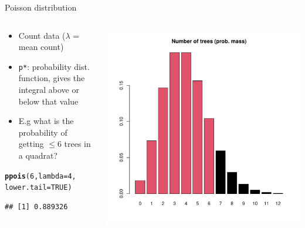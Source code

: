 \documentclass[aspectratio=169]{beamer}\usepackage[]{graphicx}\usepackage[]{color}
\makeatletter
\def\maxwidth{ %
  \ifdim\Gin@nat@width>\linewidth
    \linewidth
  \else
    \Gin@nat@width
  \fi
}
\newcommand{\hlnum}[1]{\textcolor[rgb]{0.686,0.059,0.569}{#1}}%
\newcommand{\hlstd}[1]{\textcolor[rgb]{0.345,0.345,0.345}{#1}}%
\newcommand{\hlkwc}[1]{\textcolor[rgb]{0.333,0.667,0.333}{#1}}%
\newcommand{\hlkwd}[1]{\textcolor[rgb]{0.737,0.353,0.396}{\textbf{#1}}}%
\newenvironment{kframe}{%
 \def\at@end@of@kframe{}%
 \ifinner\ifhmode%
  \def\at@end@of@kframe{\end{minipage}}%
  \begin{minipage}{\columnwidth}%
 \fi\fi%
 \def\FrameCommand##1{\hskip\@totalleftmargin \hskip-\fboxsep
 \colorbox{shadecolor}{##1}\hskip-\fboxsep
     \hskip-\linewidth \hskip-\@totalleftmargin \hskip\columnwidth}%
 \MakeFramed {\advance\hsize-\width
   \@totalleftmargin\z@ \linewidth\hsize
   \@setminipage}}%
 {\par\unskip\endMakeFramed%
 \at@end@of@kframe}
\newenvironment{knitrout}{}{} %
\makeatother
\begin{document}
\begin{frame}[fragile]{Poisson distribution}
\begin{columns}
  \begin{column}{0.5\textwidth}
  \begin{itemize}
    \item Count data ($\lambda$ = mean count)
    \item \texttt{p*}: probability dist. function, gives the integral above or below that value
    \item E.g what is the probability of getting $\le 6$ trees in a quadrat?
  \end{itemize}
\begin{knitrout}\scriptsize
{}\color{fgcolor}\begin{kframe}
\begin{alltt}
\hlkwd{ppois}\hlstd{(}\hlnum{6}\hlstd{,}\hlkwc{lambda}\hlstd{=}\hlnum{4}\hlstd{,}
      \hlkwc{lower.tail} \hlstd{=} \hlnum{TRUE}\hlstd{)}
\end{alltt}
\begin{verbatim}
## [1] 0.889326
\end{verbatim}
\end{kframe}
\end{knitrout}
  \end{column}
  \begin{column}{0.5\textwidth}
\begin{knitrout}\scriptsize
{}\color{fgcolor}
\includegraphics[width=\maxwidth]{figure/unnamed-chunk-4-1} 

\end{knitrout}
  \end{column}
\end{columns}
\end{frame}
\end{document}
